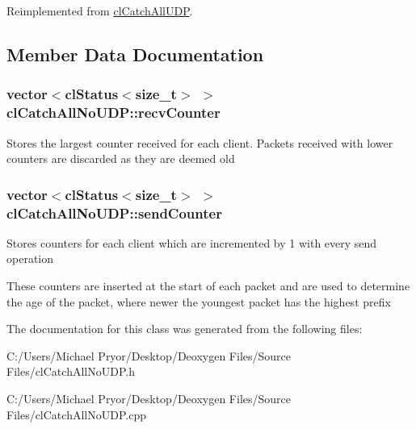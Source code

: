 Reimplemented from \hyperlink{classcl_catch_all_u_d_p_ad4530482136db2ffffff7fdac7f2e00f}{clCatchAllUDP}.



\subsection{Member Data Documentation}
\hypertarget{classcl_catch_all_no_u_d_p_a05914d96351f77d9c2b94101f118398c}{
\subsubsection[{recvCounter}]{\setlength{\rightskip}{0pt plus 5cm}vector$<${\bf clStatus}$<$size\_\-t$>$ $>$ {\bf clCatchAllNoUDP::recvCounter}}}
\label{classcl_catch_all_no_u_d_p_a05914d96351f77d9c2b94101f118398c}
Stores the largest counter received for each client. Packets received with lower counters are discarded as they are deemed old \hypertarget{classcl_catch_all_no_u_d_p_a50669cdeff504e9029f11480453748ab}{
\subsubsection[{sendCounter}]{\setlength{\rightskip}{0pt plus 5cm}vector$<${\bf clStatus}$<$size\_\-t$>$ $>$ {\bf clCatchAllNoUDP::sendCounter}}}
\label{classcl_catch_all_no_u_d_p_a50669cdeff504e9029f11480453748ab}
Stores counters for each client which are incremented by 1 with every send operation \par
 These counters are inserted at the start of each packet and are used to determine the age of the packet, where newer the youngest packet has the highest prefix 

The documentation for this class was generated from the following files:\begin{DoxyCompactItemize}
\item 
C:/Users/Michael Pryor/Desktop/Deoxygen Files/Source Files/clCatchAllNoUDP.h\item 
C:/Users/Michael Pryor/Desktop/Deoxygen Files/Source Files/clCatchAllNoUDP.cpp\end{DoxyCompactItemize}
